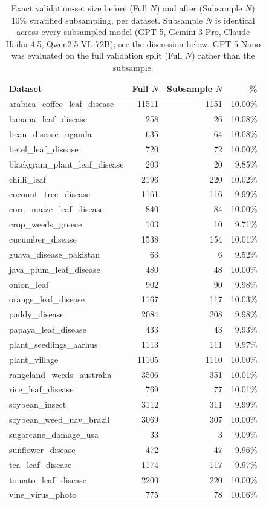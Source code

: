 \documentclass[10pt,letterpaper]{article}
\begin{document}
\begin{table}[ht]
\centering
\caption{Exact validation-set size before (Full $N$) and after (Subsample $N$) 10\% stratified subsampling, per dataset. Subsample $N$ is identical across every subsampled model (GPT-5, Gemini-3 Pro, Claude Haiku 4.5, Qwen2.5-VL-72B); see the discussion below. GPT-5-Nano was evaluated on the full validation split (Full $N$) rather than the subsample.}
\label{tab:subsample_counts}
\footnotesize
\begin{tabular}{lrrr}
\toprule
\textbf{Dataset} & \textbf{Full $N$} & \textbf{Subsample $N$} & \textbf{\%} \\
\midrule
arabica\_coffee\_leaf\_disease & 11511 & 1151 & 10.00\% \\
banana\_leaf\_disease & 258 & 26 & 10.08\% \\
bean\_disease\_uganda & 635 & 64 & 10.08\% \\
betel\_leaf\_disease & 720 & 72 & 10.00\% \\
blackgram\_plant\_leaf\_disease & 203 & 20 & 9.85\% \\
chilli\_leaf & 2196 & 220 & 10.02\% \\
coconut\_tree\_disease & 1161 & 116 & 9.99\% \\
corn\_maize\_leaf\_disease & 840 & 84 & 10.00\% \\
crop\_weeds\_greece & 103 & 10 & 9.71\% \\
cucumber\_disease & 1538 & 154 & 10.01\% \\
guava\_disease\_pakistan & 63 & 6 & 9.52\% \\
java\_plum\_leaf\_disease & 480 & 48 & 10.00\% \\
onion\_leaf & 902 & 90 & 9.98\% \\
orange\_leaf\_disease & 1167 & 117 & 10.03\% \\
paddy\_disease & 2084 & 208 & 9.98\% \\
papaya\_leaf\_disease & 433 & 43 & 9.93\% \\
plant\_seedlings\_aarhus & 1113 & 111 & 9.97\% \\
plant\_village & 11105 & 1110 & 10.00\% \\
rangeland\_weeds\_australia & 3506 & 351 & 10.01\% \\
rice\_leaf\_disease & 769 & 77 & 10.01\% \\
soybean\_insect & 3112 & 311 & 9.99\% \\
soybean\_weed\_uav\_brazil & 3069 & 307 & 10.00\% \\
sugarcane\_damage\_usa & 33 & 3 & 9.09\% \\
sunflower\_disease & 472 & 47 & 9.96\% \\
tea\_leaf\_disease & 1174 & 117 & 9.97\% \\
tomato\_leaf\_disease & 2200 & 220 & 10.00\% \\
vine\_virus\_photo & 775 & 78 & 10.06\% \\
\bottomrule
\end{tabular}
\end{table}
\end{document}
